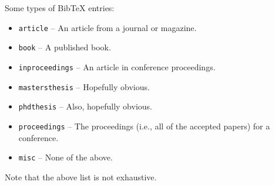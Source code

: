 \documentclass{article}
\begin{document}
Some types of BibTeX entries:
\begin{itemize}
  \item {\tt article} -- An article from a journal or magazine.
  \item {\tt book} -- A published book.
  \item {\tt inproceedings} -- An article in conference proceedings.
  \item {\tt mastersthesis} -- Hopefully obvious.
  \item {\tt phdthesis} -- Also, hopefully obvious.
  \item {\tt proceedings} -- The proceedings (i.e., all of the accepted papers) for a conference.
  \item {\tt misc} -- None of the above.
\end{itemize}

Note that the above list is not exhaustive.


%

\end{document}
